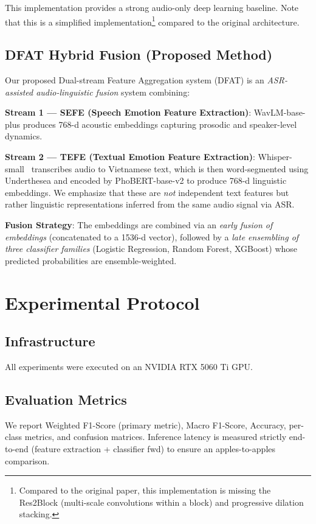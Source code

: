 \documentclass[12pt,a4paper]{report}
\begin{document}
This implementation provides a strong audio-only deep learning baseline. Note that this is a simplified implementation\footnote{Compared to the original paper, this implementation is missing the Res2Block (multi-scale convolutions within a block) and progressive dilation stacking.} compared to the original architecture.

\section{DFAT Hybrid Fusion (Proposed Method)}
Our proposed Dual-stream Feature Aggregation system (DFAT) is an \emph{ASR-assisted audio-linguistic fusion} system combining:

\textbf{Stream 1 --- SEFE (Speech Emotion Feature Extraction)}: WavLM-base-plus produces 768-d acoustic embeddings capturing prosodic and speaker-level dynamics.

\textbf{Stream 2 --- TEFE (Textual Emotion Feature Extraction)}: Whisper-small~\cite{whisper} transcribes audio to Vietnamese text, which is then word-segmented using Underthesea and encoded by PhoBERT-base-v2 to produce 768-d linguistic embeddings. We emphasize that these are \emph{not} independent text features but rather linguistic representations inferred from the same audio signal via ASR.

\textbf{Fusion Strategy}: The embeddings are combined via an \emph{early fusion of embeddings} (concatenated to a 1536-d vector), followed by a \emph{late ensembling of three classifier families} (Logistic Regression, Random Forest, XGBoost) whose predicted probabilities are ensemble-weighted.



\chapter{Experimental Protocol}

\section{Infrastructure}
All experiments were executed on an NVIDIA RTX 5060 Ti GPU.

\section{Evaluation Metrics}
We report Weighted F1-Score (primary metric), Macro F1-Score, Accuracy, per-class metrics, and confusion matrices. Inference latency is measured strictly end-to-end (feature extraction + classifier fwd) to ensure an apples-to-apples comparison.
\end{document}
